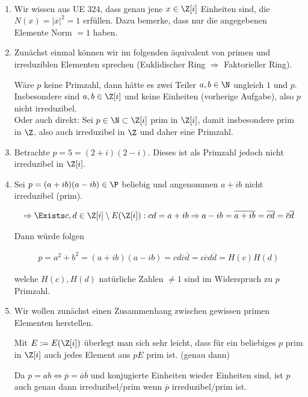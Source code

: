 \begin{solution}
\leavevmode \\
\begin{enumerate}
  \item Wir wissen aus UE 324, dass genau jene $x \in \Z[i]$ Einheiten sind,
  die $N(x) = |x|^2 = 1$ erfüllen. Dazu bemerke, dass nur die angegebenen Elemente Norm $= 1$ haben.

  \item Zunächst einmal können wir im folgenden äquivalent von primen und irreduziblen Elementen sprechen (Euklidischer Ring $\Rightarrow$ Faktorieller Ring).

  Wäre $p$ keine Primzahl, dann hätte es zwei Teiler $a,b \in \N$ ungleich $1$ und $p$. Insbesondere sind $a,b \in \Z [i]$ und keine Einheiten (vorherige Aufgabe), also $p$ nicht irreduzibel. \\
  Oder auch direkt: Sei $p \in \N \subset \Z[i]$ prim in $\Z[i]$, damit insbesondere prim in $\Z$,
  also auch irreduzibel in $\Z$ und daher eine Primzahl.

  \item Betrachte $p = 5 = (2+i)(2-i)$. Dieses ist als Primzahl jedoch nicht irreduzibel in $\Z [i]$.

  \item Sei $p = (a+ib)(a-ib) \in \P$ beliebig und angenommen $a+ib$ nicht irreduzibel (prim).

  \begin{align*}
    \Rightarrow \Exists c,d \in \Z [i] \setminus E(\Z [i]):  cd = a+ib \Rightarrow a - ib = \overline{a+ib} = \overline{cd} = \overline{c} \overline{d}
  \end{align*}

  Dann würde folgen

  \begin{align*}
    p = a^2 + b^2 = (a+ib)(a-ib) = cd\overline{c} \overline{d} = c\overline{c}d \overline{d} = H(c)H(d)
  \end{align*}

  welche $H(c),H(d)$ natürliche Zahlen $\neq 1$ sind im Widerspruch zu $p$ Primzahl.

  \item Wir wollen zunächst einen Zusammenhang zwischen gewissen primen Elementen herstellen.

  Mit $E:= E(\Z [i])$ überlegt man sich sehr leicht, dass für ein beliebiges $p$ prim in $\Z [i]$ auch jedes Element aus $pE$ prim ist. (genau dann)

  Da $p = ab \iff \overline{p} = \overline{a}\overline{b}$ und konjugierte Einheiten wieder Einheiten sind,
  ist $p$ auch genau dann
  irreduzibel/prim wenn $\overline{p}$ irreduzibel/prim ist.


\end{enumerate}
\end{solution}
